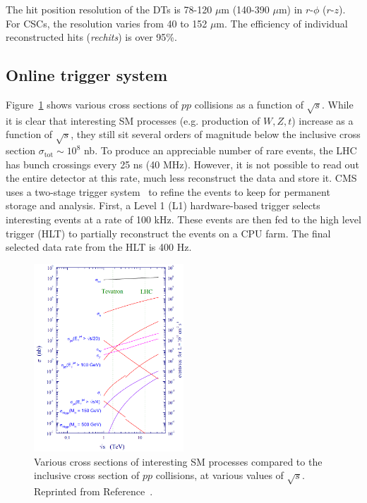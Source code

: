The hit position resolution of the DTs is 78-120 $\mu$m (140-390 $\mu$m) in $r$-$\phi$ ($r$-$z$).
For CSCs, the resolution varies from 40 to 152 $\mu$m.
The efficiency of individual reconstructed hits (\emph{rechits}) is over 95\%.

\subsection{Online trigger system}

Figure~\ref{fig:cms:xsecs} shows various cross sections of $pp$ collisions as a function of $\sqrt{s}$.
While it is clear that interesting SM processes (e.g. production of $W,Z,t$) increase as a function of $\sqrt{s}$, they still sit several orders of magnitude below the inclusive cross section $\sigma_\mathrm{tot}\sim 10^8$ nb.
To produce an appreciable number of rare events, the LHC has bunch crossings every 25 ns (40 MHz).
However, it is not possible to read out the entire detector at this rate, much less reconstruct the data and store it.
CMS uses a two-stage trigger system~\cite{cmstrig} to refine the events to keep for permanent storage and analysis.
First, a Level 1 (L1) hardware-based trigger selects interesting events at a rate of 100 kHz.
These events are then fed to the high level trigger (HLT) to partially reconstruct the events on a CPU farm.
The final selected data rate from the HLT is 400 Hz.

\begin{figure}[]
\begin{center}
	\includegraphics[width=0.5\textwidth,angle=90]{figures/cms/xsec.png}
	\caption{Various cross sections of interesting SM processes compared to the inclusive cross section of $pp$ collisions, at various values of $\sqrt{s}$.
				Reprinted from Reference~\cite{lhcxsec}.}
	\label{fig:cms:xsecs}
\end{center}
\end{figure}

